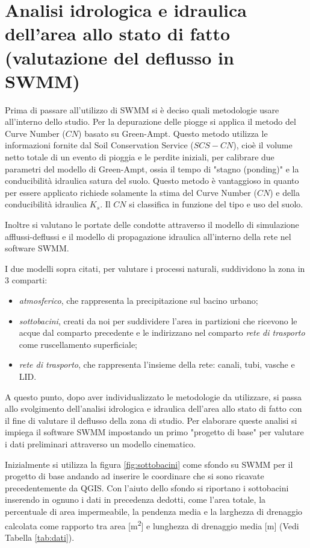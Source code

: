 \chapter{Analisi idrologica e idraulica dell’area allo stato di fatto (valutazione del deflusso in SWMM)}\label{cap:progettoBase}
Prima di passare all'utilizzo di SWMM si è deciso quali metodologie usare all'interno dello studio.
Per la depurazione delle piogge si applica il metodo del Curve Number ($CN$) basato su Green-Ampt. 
Questo metodo utilizza le informazioni fornite dal Soil Conservation Service ($SCS-CN$), cioè il volume netto totale di un evento di pioggia e le perdite iniziali, per calibrare due parametri del modello di Green-Ampt, ossia il tempo di "stagno (ponding)" e la conducibilità idraulica satura del suolo.
Questo metodo è vantaggioso in quanto per essere applicato richiede solamente la stima del Curve Number ($CN$) e della conducibilità idraulica $K_s$. 
Il $CN$ si classifica in funzione del tipo e uso del suolo. 

Inoltre si valutano le portate delle condotte attraverso il modello di simulazione afflussi-deflussi e il modello di propagazione idraulica all'interno della rete nel software SWMM.

I due modelli sopra citati, per valutare i processi naturali, suddividono la zona in 3 comparti:
\begin{itemize}
\item \emph{atmosferico}, che rappresenta la precipitazione sul bacino urbano;
\item \emph{sottobacini}, creati da noi per suddividere l'area in partizioni che ricevono le acque dal comparto precedente e le indirizzano nel comparto \emph{rete di trasporto} come ruscellamento superficiale;
\item \emph{rete di trasporto}, che rappresenta l'insieme della rete: canali, tubi, vasche e LID.
\end{itemize}
A questo punto, dopo aver individualizzato le metodologie da utilizzare, si passa allo svolgimento dell'analisi idrologica e idraulica dell'area allo stato di fatto con il fine di valutare il deflusso della zona di studio.
Per elaborare queste analisi si impiega il software SWMM impostando un primo "progetto di base" per valutare i dati preliminari attraverso un modello cinematico.

Inizialmente si utilizza la figura \ref{fig:sottobacini} come sfondo su SWMM per il progetto di base andando ad inserire le coordinare che si sono ricavate precedentemente da QGIS.
Con l'aiuto dello sfondo si riportano i sottobacini inserendo in ognuno i dati in precedenza dedotti, come l'area totale, la percentuale di area impermeabile, la pendenza media e la larghezza di drenaggio calcolata come rapporto tra area [\si{\square\metre}] e lunghezza di drenaggio media [\si{\metre}] (Vedi Tabella \ref{tab:dati}).

